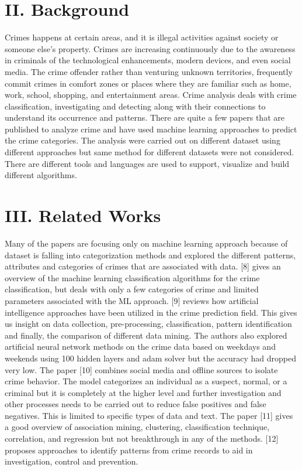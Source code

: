 \documentclass[10 pt,conference,final,]{IEEEtran}
\begin{document}
\section{II. Background}\label{ii.-background}

Crimes happens at certain areas, and it is illegal activities against
society or someone else's property. Crimes are increasing continuously
due to the awareness in criminals of the technological enhancements,
modern devices, and even social media. The crime offender rather than
venturing unknown territories, frequently commit crimes in comfort zones
or places where they are familiar such as home, work, school, shopping,
and entertainment areas. Crime analysis deals with crime classification,
investigating and detecting along with their connections to understand
its occurrence and patterns. There are quite a few papers that are
published to analyze crime and have used machine learning approaches to
predict the crime categories. The analysis were carried out on different
dataset using different approaches but same method for different
datasets were not considered. There are different tools and languages
are used to support, visualize and build different algorithms.

\section{III. Related Works}\label{iii.-related-works}

Many of the papers are focusing only on machine learning approach
because of dataset is falling into categorization methods and explored
the different patterns, attributes and categories of crimes that are
associated with data. {[}8{]} gives an overview of the machine learning
classification algorithms for the crime classification, but deals with
only a few categories of crime and limited parameters associated with
the ML approach. {[}9{]} reviews how artificial intelligence approaches
have been utilized in the crime prediction field. This gives us insight
on data collection, pre-processing, classification, pattern
identification and finally, the comparison of different data mining. The
authors also explored artificial neural network methods on the crime
data based on weekdays and weekends using 100 hidden layers and adam
solver but the accuracy had dropped very low. The paper {[}10{]}
combines social media and offline sources to isolate crime behavior. The
model categorizes an individual as a suspect, normal, or a criminal but
it is completely at the higher level and further investigation and other
processes needs to be carried out to reduce false positives and false
negatives. This is limited to specific types of data and text. The paper
{[}11{]} gives a good overview of association mining, clustering,
classification technique, correlation, and regression but not
breakthrough in any of the methods. {[}12{]} proposes approaches to
identify patterns from crime records to aid in investigation, control
and prevention.
\end{document}
